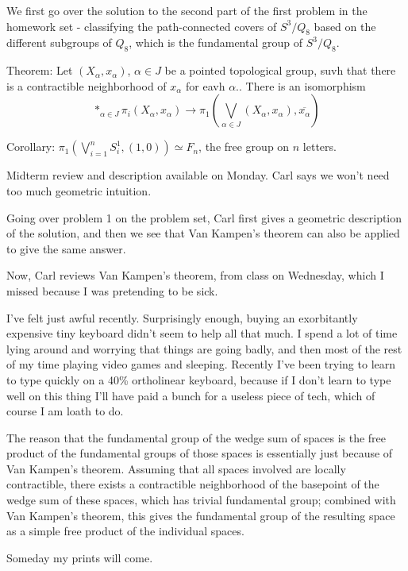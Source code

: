 We first go over the solution to the second part of the first problem in the homework set - classifying the path-connected covers of $S^3 / Q_8$ based on the different subgroups of $Q_8$, which is the fundamental group of $S^3/Q_8$.
\par Theorem: Let $(X_\alpha, x_\alpha)$, $\alpha \in J$ be a pointed topological group, suvh that there is a contractible neighborhood of $x_\alpha$ for eavh $\alpha$.. There is an isomorphism 
\[*_{\alpha \in J}\pi_i(X_\alpha, x_\alpha) \to \pi_1 (\bigvee_{\alpha \in J} (X_\alpha, x_\alpha), \overline {x_\alpha})\]
\par Corollary: $\pi_1\left( \bigvee_{i=1}^n S_i^1, (1,0) \right) \simeq F_n$, the free group on $n$ letters. 
\par Midterm review and description available on Monday. Carl says we won't need too much geometric intuition. 
\par Going over problem 1 on the problem set, Carl first gives a geometric description of the solution, and then we see that Van Kampen's theorem can also be applied to give the same answer.
\par Now, Carl reviews Van Kampen's theorem, from class on Wednesday, which I missed because I was pretending to be sick. 
\par I've felt just awful recently. Surprisingly enough, buying an exorbitantly expensive tiny keyboard didn't seem to help all that much. I spend a lot of time lying around and worrying that things are going badly, and then most of the rest of my time playing video games and sleeping. Recently I've been trying to learn to type quickly on a 40\% ortholinear keyboard, because if I don't learn to type well on this thing I'll have paid a bunch for a useless piece of tech, which of course I am
loath to do.
\par 
\par The reason that the fundamental group of the wedge sum of spaces is the free product of the fundamental groups of those spaces is essentially just because of Van Kampen's theorem. Assuming that all spaces involved are locally contractible, there exists a contractible neighborhood of the basepoint of the wedge sum of these spaces, which has trivial fundamental group; combined with Van Kampen's theorem, this gives the fundamental group of the resulting space as a simple free
product of the individual spaces.
\par Someday my prints will come.
\par \

